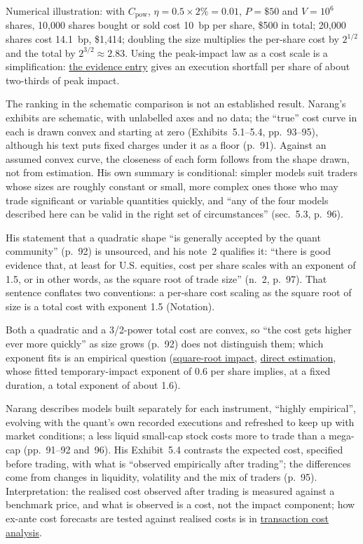 \begin{qfmodel}
Numerical illustration: with $C_{\mathrm{pow}}$, $\eta=0.5\times2\%=0.01$, $P=\$50$ and $V=10^6$ shares, 10{,}000 shares bought or sold cost 10~bp per share, \$500 in total; 20{,}000 shares cost 14.1~bp, \$1{,}414; doubling the size multiplies the per-share cost by $2^{1/2}$ and the total by $2^{3/2}\approx2.83$. Using the peak-impact law as a cost scale is a simplification: \hyperref[ev:square-root-impact]{the evidence entry} gives an execution shortfall per share of about two-thirds of peak impact.

 The ranking in the schematic comparison is not an established result. Narang's exhibits are schematic, with unlabelled axes and no data; the ``true'' cost curve in each is drawn convex and starting at zero (Exhibits~5.1--5.4, pp.~93--95), although his text puts fixed charges under it as a floor (p.~91). Against an assumed convex curve, the closeness of each form follows from the shape drawn, not from estimation. His own summary is conditional: simpler models suit traders whose sizes are roughly constant or small, more complex ones those who may trade significant or variable quantities quickly, and ``any of the four models described here can be valid in the right set of circumstances'' (sec.~5.3, p.~96).

His statement that a quadratic shape ``is generally accepted by the quant community'' (p.~92) is unsourced, and his note~2 qualifies it: ``there is good evidence that, at least for U.S. equities, cost per share scales with an exponent of 1.5, or in other words, as the square root of trade size'' (n.~2, p.~97). That sentence conflates two conventions: a per-share cost scaling as the square root of size is a total cost with exponent 1.5 (Notation).

Both a quadratic and a 3/2-power total cost are convex, so ``the cost gets higher ever more quickly'' as size grows (p.~92) does not distinguish them; which exponent fits is an empirical question (\hyperref[ev:square-root-impact]{square-root impact}, \hyperref[meth:almgren-impact-estimation]{direct estimation}, whose fitted temporary-impact exponent of 0.6 per share implies, at a fixed duration, a total exponent of about 1.6).

 Narang describes models built separately for each instrument, ``highly empirical'', evolving with the quant's own recorded executions and refreshed to keep up with market conditions; a less liquid small-cap stock costs more to trade than a mega-cap (pp.~91--92 and~96). His Exhibit~5.4 contrasts the expected cost, specified before trading, with what is ``observed empirically after trading''; the differences come from changes in liquidity, volatility and the mix of traders (p.~95). Interpretation: the realised cost observed after trading is measured against a benchmark price, and what is observed is a cost, not the impact component; how ex-ante cost forecasts are tested against realised costs is in \hyperref[meth:transaction-cost-analysis]{transaction cost analysis}.


\end{qfmodel}
